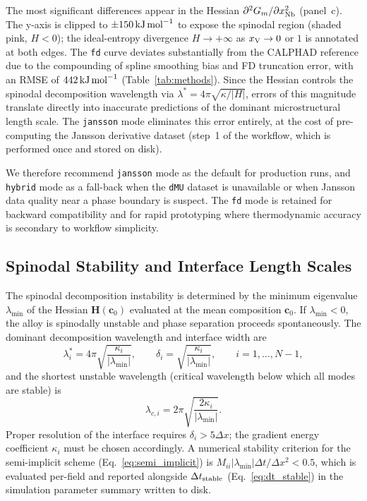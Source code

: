 The most significant differences appear in the Hessian
$\partial^2 G_m/\partial x_{\rm Nb}^2$ (panel~c).  The y-axis is
clipped to $\pm 150\,\text{kJ\,mol}^{-1}$ to expose the spinodal
region (shaded pink, $H < 0$); the ideal-entropy divergence
$H \to +\infty$ as $x_{\rm V} \to 0$ or $1$ is annotated at both
edges.  The \texttt{fd} curve deviates substantially from the
CALPHAD reference due to the compounding of spline smoothing bias
and FD truncation error, with an RMSE of $442\,\text{kJ\,mol}^{-1}$
(Table~\ref{tab:methods}).  Since the Hessian controls the spinodal
decomposition wavelength via $\lambda^* = 4\pi\sqrt{\kappa/|H|}$,
errors of this magnitude translate directly into inaccurate
predictions of the dominant microstructural length scale.  The
\texttt{jansson} mode eliminates this error entirely, at the cost of
pre-computing the Jansson derivative dataset (step~1 of the workflow,
which is performed once and stored on disk).

We therefore recommend \texttt{jansson} mode as the default for
production runs, and \texttt{hybrid} mode as a fall-back when
the \texttt{dMU} dataset is unavailable or when Jansson data quality
near a phase boundary is suspect.  The \texttt{fd} mode is retained
for backward compatibility and for rapid prototyping where
thermodynamic accuracy is secondary to workflow simplicity.

\subsection{Spinodal Stability and Interface Length Scales}
\label{sec:length_scales}

The spinodal decomposition instability is determined by the minimum
eigenvalue $\lambda_{\min}$ of the Hessian $\bm{H}(\bm{c}_0)$
evaluated at the mean composition $\bm{c}_0$.  If
$\lambda_{\min} < 0$, the alloy is spinodally unstable and phase
separation proceeds spontaneously.  The dominant decomposition
wavelength and interface width are
\begin{equation}
  \lambda_i^* = 4\pi\sqrt{\frac{\kappa_i}{|\lambda_{\min}|}},
  \qquad
  \delta_i = \sqrt{\frac{\kappa_i}{|\lambda_{\min}|}},
  \qquad
  i = 1,\ldots,N-1,
  \label{eq:length_scales}
\end{equation}
and the shortest unstable wavelength (critical wavelength below which
all modes are stable) is
\begin{equation}
  \lambda_{c,i} = 2\pi\sqrt{\frac{2\kappa_i}{|\lambda_{\min}|}}.
  \label{eq:lambda_c}
\end{equation}
Proper resolution of the interface requires $\delta_i > 5\Delta x$;
the gradient energy coefficient $\kappa_i$ must be chosen
accordingly.  A numerical stability criterion for the semi-implicit
scheme (Eq.~\ref{eq:semi_implicit}) is
$M_{ii}|\lambda_{\min}|\Delta t/\Delta x^2 < 0.5$, which is
evaluated per-field and reported alongside $\Delta t_{\rm stable}$
(Eq.~\ref{eq:dt_stable}) in the simulation parameter summary written
to disk.
